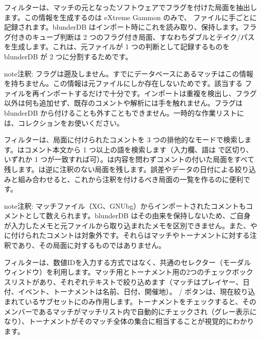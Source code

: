 \documentclass[letterpaper,10pt,dvipdfmx]{sphinxmanual}
\begin{document}
\sphinxAtStartPar
{}フィルターは、マッチの元となったソフトウェアでフラグを付けた局面を抽出します。この情報を生成するのは eXtreme Gammon のみで、 ファイルに手ごとに記録されます。blunderDB はインポート時にこれを読み取り、保持します。フラグ付きのキューブ判断は 2 つのフラグ付き局面、すなわちダブルとテイク/パスを生成します。これは、元ファイルが 1 つの判断として記録するものを blunderDB が 2 つに分割するためです。

\begin{sphinxadmonition}{note}{注釈:}
\sphinxAtStartPar
フラグは遡及しません。すでにデータベースにあるマッチはこの情報を持ちません。この情報は元ファイルにしか存在しないためです。該当する  ファイルを再インポートするだけで十分です。インポートは重複を検出し、フラグ以外は何も追加せず、既存のコメントや解析には手を触れません。フラグは blunderDB から付けることも外すこともできません。一時的な作業リストには、コレクションをお使いください。
\end{sphinxadmonition}

\sphinxAtStartPar
{}フィルターは、局面に付けられたコメントを 3 つの排他的なモードで検索します。はコメント本文から 1 つ以上の語を検索します（入力欄、語は \sphinxcode{\sphinxupquote{;}} で区切り、いずれか 1 つが一致すれば可）。は内容を問わずコメントの付いた局面をすべて残します。は逆に注釈のない局面を残します。誤差やデータの日付による絞り込みと組み合わせると、これから注釈を付けるべき局面の一覧を作るのに便利です。

\begin{sphinxadmonition}{note}{注釈:}
\sphinxAtStartPar
マッチファイル（XG、GNUbg）からインポートされたコメントもコメントとして数えられます。blunderDB はその由来を保持しないため、ご自身が入力したメモと元ファイルから取り込まれたメモを区別できません。また、やに付けられたコメントは対象外です。それらはマッチやトーナメントに対する注釈であり、その局面に対するものではありません。
\end{sphinxadmonition}

\sphinxAtStartPar
{} フィルターは、数値IDを入力する方式ではなく、共通のセレクター（モーダルウィンドウ）を利用します。マッチ用とトーナメント用の2つのチェックボックスリストがあり、それぞれテキストで絞り込めます（マッチはプレイヤー、日付、イベント、トーナメントは名前、日付、開催地）。 /  ボタンは、現在絞り込まれているサブセットにのみ作用します。トーナメントをチェックすると、そのメンバーであるマッチがマッチリスト内で自動的にチェックされ（グレー表示になり）、トーナメントがそのマッチ全体の集合に相当することが視覚的にわかります。
\end{document}
